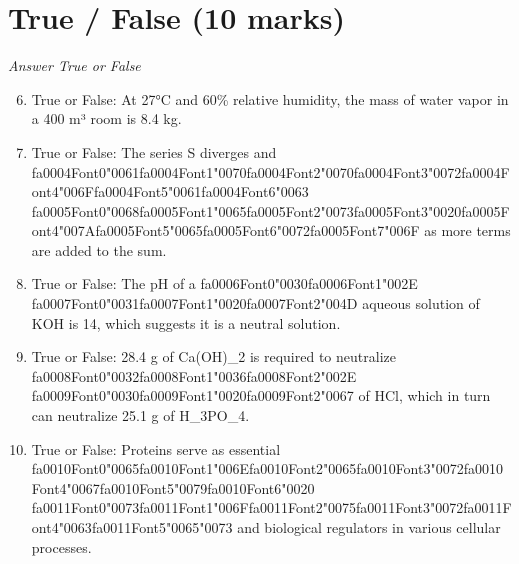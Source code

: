 \documentclass[12pt]{article}
\begin{document}
\section*{True / False (10 marks)}
\textit{Answer True or False}
\begin{enumerate}[label=\arabic*.]
\setcounter{enumi}{5}
\item True or False: At 27°C and 60\% relative humidity, the mass of water vapor in a 400 m³ room is 8.4 kg.
\item True or False: The series S diverges and {\csname fa0004Font0\endcsname\char"0061}{\csname fa0004Font1\endcsname\char"0070}{\csname fa0004Font2\endcsname\char"0070}{\csname fa0004Font3\endcsname\char"0072}{\csname fa0004Font4\endcsname\char"006F}{\csname fa0004Font5\endcsname\char"0061}{\csname fa0004Font6\endcsname\char"0063} {\csname fa0005Font0\endcsname\char"0068}{\csname fa0005Font1\endcsname\char"0065}{\csname fa0005Font2\endcsname\char"0073}{\csname fa0005Font3\endcsname\char"0020}{\csname fa0005Font4\endcsname\char"007A}{\csname fa0005Font5\endcsname\char"0065}{\csname fa0005Font6\endcsname\char"0072}{\csname fa0005Font7\endcsname\char"006F} as more terms are added to the sum.
\item True or False: The pH of a {\csname fa0006Font0\endcsname\char"0030}{\csname fa0006Font1\endcsname\char"002E} {\csname fa0007Font0\endcsname\char"0031}{\csname fa0007Font1\endcsname\char"0020}{\csname fa0007Font2\endcsname\char"004D} aqueous solution of KOH is 14, which suggests it is a neutral solution.
\item True or False: 28.4 g of Ca(OH)\_2 is required to neutralize {\csname fa0008Font0\endcsname\char"0032}{\csname fa0008Font1\endcsname\char"0036}{\csname fa0008Font2\endcsname\char"002E} {\csname fa0009Font0\endcsname\char"0030}{\csname fa0009Font1\endcsname\char"0020}{\csname fa0009Font2\endcsname\char"0067} of HCl, which in turn can neutralize 25.1 g of H\_3PO\_4.
\item True or False: Proteins serve as essential {\csname fa0010Font0\endcsname\char"0065}{\csname fa0010Font1\endcsname\char"006E}{\csname fa0010Font2\endcsname\char"0065}{\csname fa0010Font3\endcsname\char"0072}{\csname fa0010Font4\endcsname\char"0067}{\csname fa0010Font5\endcsname\char"0079}{\csname fa0010Font6\endcsname\char"0020} {\csname fa0011Font0\endcsname\char"0073}{\csname fa0011Font1\endcsname\char"006F}{\csname fa0011Font2\endcsname\char"0075}{\csname fa0011Font3\endcsname\char"0072}{\csname fa0011Font4\endcsname\char"0063}{\csname fa0011Font5\endcsname\char"0065}{\char"0073} and biological regulators in various cellular processes.
\end{enumerate}
\end{document}
